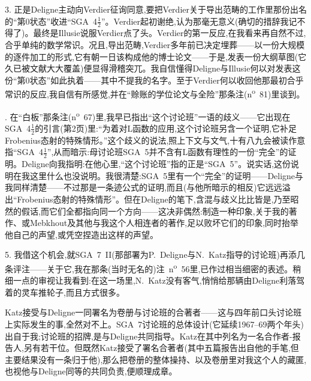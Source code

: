 \dmark{}3. 正是Deligne主动向Verdier征询同意,要把Verdier关于导出范畴的工作里那份出名的“第0状态”收进“SGA~4$\frac{1}{2}$”。Verdier起初谢绝,认为那毫无意义(确切的措辞我记不得了)。最终是Illusie说服Verdier点了头。Verdier的第一反应,在我看来再自然不过,合乎单纯的数学常识。况且,导出范畴,Verdier多年前已决定埋葬——以一份大规模的逐件加工的形式,它有朝一日该构成他的博士论文——于是,发表一份大纲草图(它久已被文献大大覆盖)便显得滑稽突兀。我自信懂得Deligne与Illusie何以对发表这份“第0状态”如此执着——其中不提我的名字。至于Verdier何以收回他那最初合乎常识的反应,我自信有所感觉,并在“赊账的学位论文与全险”那条注(n\textsuperscript{o}~81)里谈到。

\par{}. 在“白板”那条注(n\textsuperscript{o}~67)里,我早已指出“这个讨论班”一语的歧义——它出现在SGA~4$\frac{1}{2}$的引言(第2页)里:“为着对L函数的应用,这个讨论班另含一个证明,它补足Frobenius态射的特殊情形。”这个歧义的说法,照上下文与文气,十有八九会被读作意指“SGA~4$\frac{1}{2}$”,从而暗示:母讨论班SGA~5并不含有L函数有理性的一份“完全”的证明。Deligne向我指明:在他心里,“这个讨论班”指的正是“SGA~5”。说实话,这份说明在我这里什么也没说明。我很清楚:SGA~5里有一个“完全”的证明——Deligne与我同样清楚——不过那是一条迹公式的证明,而且(与他所暗示的相反)它远远溢出“Frobenius态射的特殊情形”。但在Deligne的笔下,含混与歧义比比皆是,乃至昭然的假话,而它们全都指向同一个方向——这决非偶然:制造一种印象,关于我的著作、或Mebkhout及其他与我这个人相连者的著作,足以败坏它们的印象,同时抬举他自己的声望,或凭空捏造出这样的声望。

\dmark{}5. 我借这个机会,就SGA~7~II(那部署为P.~Deligne与N.~Katz指导的讨论班)再添几条评注——关于它,我在那条(当时无名的)注~n\textsuperscript{o}~56里,已作过相当细密的表述。稍细一点的审视让我看到:在这一场里,N.~Katz没有客气,悄悄给那辆由Deligne利落驾着的灵车推轮子,而且方式很多。

Katz接受与Deligne一同署名为卷册与讨论班的合著者——这与四年前口头讨论班上实际发生的事,全然对不上。SGA~7讨论班的总体设计(它延续1967--69两个年头)出自于我;讨论班的招牌,是与Deligne共同指导。Katz在其中列名为一名合作者-报告人,另有若干位。但既然Katz接受了署名合著者(其中五篇报告出自他的手笔,但主要结果没有一条归于他),那么把卷册的整体操持、以及卷册里对我这个人的藏匿,也视他与Deligne同等的共同负责,便顺理成章。

